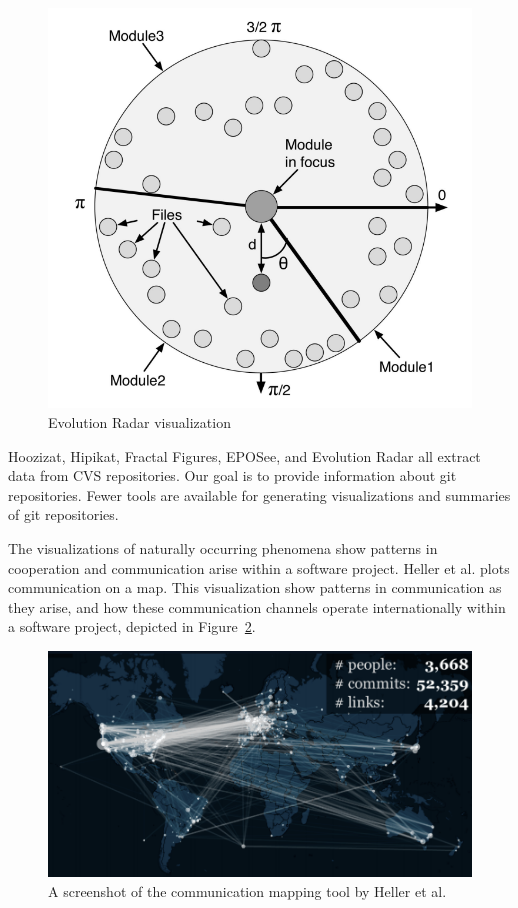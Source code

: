 \begin{figure}[htpb]
  \centering
  \includegraphics[width=0.8\linewidth]{Figures/introduction/evo_radar.png}
  \caption{Evolution Radar visualization\cite{Ambros2009}}
  \label{fig:evolution_radar}
\end{figure}

Hoozizat, Hipikat, Fractal Figures, EPOSee, and Evolution Radar all
extract data from CVS repositories. Our goal is to provide information
about git repositories. Fewer tools are available for generating
visualizations and summaries of git repositories.

The visualizations of naturally occurring phenomena show patterns
in cooperation and communication arise within a software project.
Heller et al.\cite{Heller2011} plots communication on a map.
This visualization show patterns in communication as they arise, and how
these communication channels operate internationally within a software
project, depicted in Figure~\ref{fig:heller_map}.

\begin{figure}[htpb]
  \centering
  \includegraphics[width=0.8\linewidth]{Figures/background/heller_map.png}
  \caption{A screenshot of the communication mapping tool by Heller et
    al.\cite{Heller2011}}
  \label{fig:heller_map}
\end{figure}

